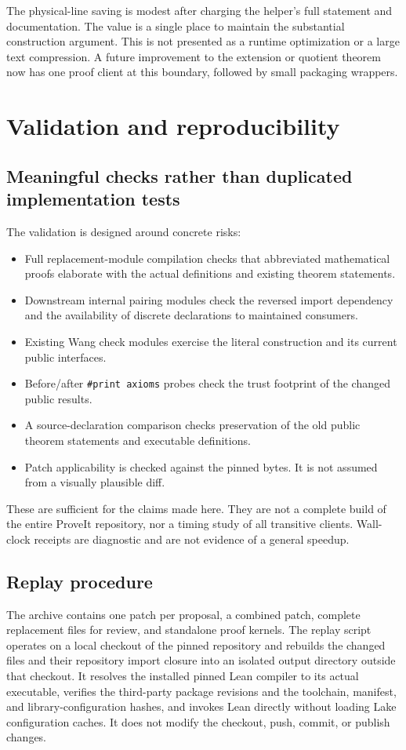 \documentclass[11pt,letterpaper]{article}
\newcommand{\code}[1]{\nolinkurl{#1}}
\begin{document}
The physical-line saving is modest after charging the helper's full statement and documentation. The value is a single place to maintain the substantial construction argument. This is not presented as a runtime optimization or a large text compression. A future improvement to the extension or quotient theorem now has one proof client at this boundary, followed by small packaging wrappers.

\section{Validation and reproducibility}


\subsection{Meaningful checks rather than duplicated implementation tests}
The validation is designed around concrete risks:
\begin{itemize}
\item Full replacement-module compilation checks that abbreviated mathematical proofs elaborate with the actual definitions and existing theorem statements.
\item Downstream internal pairing modules check the reversed import dependency and the availability of discrete declarations to maintained consumers.
\item Existing Wang check modules exercise the literal construction and its current public interfaces.
\item Before/after \code{\#print axioms} probes check the trust footprint of the changed public results.
\item A source-declaration comparison checks preservation of the old public theorem statements and executable definitions.
\item Patch applicability is checked against the pinned bytes. It is not assumed from a visually plausible diff.
\end{itemize}
These are sufficient for the claims made here. They are not a complete build of the entire ProveIt repository, nor a timing study of all transitive clients. Wall-clock receipts are diagnostic and are not evidence of a general speedup.

\subsection{Replay procedure}
The archive contains one patch per proposal, a combined patch, complete replacement files for review, and standalone proof kernels. The replay script operates on a local checkout of the pinned repository and rebuilds the changed files and their repository import closure into an isolated output directory outside that checkout. It resolves the installed pinned Lean compiler to its actual executable, verifies the third-party package revisions and the toolchain, manifest, and library-configuration hashes, and invokes Lean directly without loading Lake configuration caches. It does not modify the checkout, push, commit, or publish changes.
\end{document}
